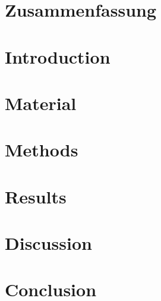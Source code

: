 \documentclass[
oneside,
a4paper,
12pt,
titlepage]
{article}
\begin{document}

\newpage


\newpage


\newpage

\section*{Zusammenfassung}


\pagestyle{standard}

\newpage
\section{Introduction}


\section{Material}



\section{Methods}






\section{Results}








\section{Discussion}







\section{Conclusion}


\newpage{}


\newpage{}

\end{document}
